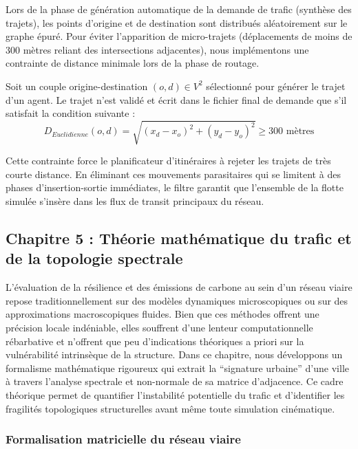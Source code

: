 \documentclass[11pt, a4paper]{article}
\begin{document}
Lors de la phase de génération automatique de la demande de trafic
(synthèse des trajets), les points d'origine et de destination sont
distribués aléatoirement sur le graphe épuré. Pour éviter l'apparition
de micro-trajets (déplacements de moins de 300 mètres reliant des
intersections adjacentes), nous implémentons une contrainte de distance
minimale lors de la phase de routage.

Soit un couple origine-destination \((o, d) \in V^2\) sélectionné pour
générer le trajet d'un agent. Le trajet n'est validé et écrit dans le
fichier final de demande que s'il satisfait la condition suivante :
\[D_{Euclidienne}(o, d) = \sqrt{(x_d - x_o)^2 + (y_d - y_o)^2} \ge 300 \text{ mètres}\]

Cette contrainte force le planificateur d'itinéraires à rejeter les
trajets de très courte distance. En éliminant ces mouvements
parasitaires qui se limitent à des phases d'insertion-sortie immédiates,
le filtre garantit que l'ensemble de la flotte simulée s'insère dans les
flux de transit principaux du réseau.

\newpage

\subsection{Chapitre 5 : Théorie mathématique du trafic et de la
topologie
spectrale}\label{chapitre-5-thuxe9orie-mathuxe9matique-du-trafic-et-de-la-topologie-spectrale}

L'évaluation de la résilience et des émissions de carbone au sein d'un
réseau viaire repose traditionnellement sur des modèles dynamiques
microscopiques ou sur des approximations macroscopiques fluides. Bien
que ces méthodes offrent une précision locale indéniable, elles
souffrent d'une lenteur computationnelle rébarbative et n'offrent que
peu d'indications théoriques a priori sur la vulnérabilité intrinsèque
de la structure. Dans ce chapitre, nous développons un formalisme
mathématique rigoureux qui extrait la ``signature urbaine'' d'une ville
à travers l'analyse spectrale et non-normale de sa matrice d'adjacence.
Ce cadre théorique permet de quantifier l'instabilité potentielle du
trafic et d'identifier les fragilités topologiques structurelles avant
même toute simulation cinématique.

\subsubsection{Formalisation matricielle du réseau
viaire}\label{formalisation-matricielle-du-ruxe9seau-viaire}
\end{document}
